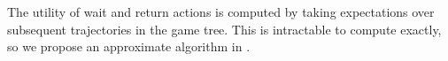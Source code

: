 The utility of wait and return actions is computed by taking expectations over subsequent trajectories in the game tree. 
This is intractable to compute exactly, so we propose an approximate algorithm in .

%
%







